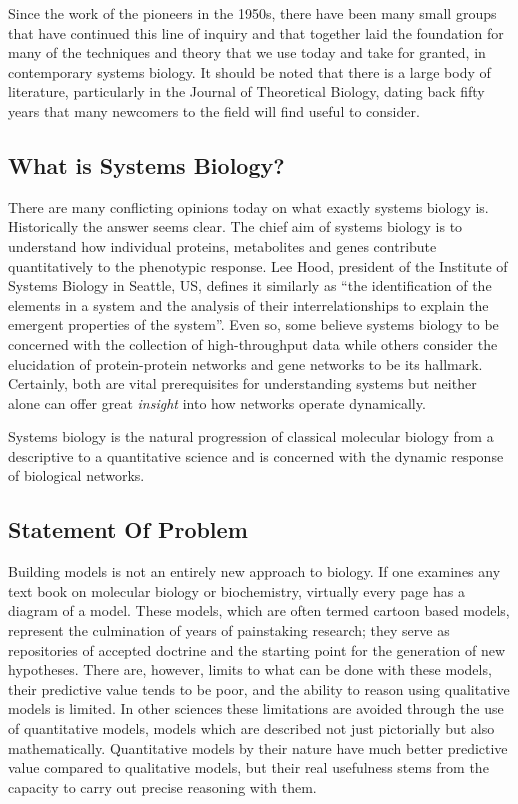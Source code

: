 \documentclass[]{article}
\begin{document}
Since the work of the pioneers in the 1950s, there have been many small
groups that have continued this line of inquiry and that together laid
the foundation for many of the techniques and theory that we use today
and take for granted, in contemporary systems biology. It should be
noted that there is a large body of literature, particularly in the
Journal of Theoretical Biology, dating back fifty years that many
newcomers to the field will find useful to consider.

\subsection{What is Systems Biology?}

There are many conflicting opinions today on what exactly systems
biology is. Historically the answer seems clear. The chief aim of
systems biology is to understand how individual proteins, metabolites
and genes contribute quantitatively to the phenotypic response. Lee
Hood, president of the Institute of Systems Biology in Seattle, US,
defines it similarly as ``the identification of the elements in a system
and the analysis of their interrelationships to explain the emergent
properties of the system''. Even so, some believe systems biology to be
concerned with the collection of high-throughput data while others
consider the elucidation of protein-protein networks and gene networks
to be its hallmark. Certainly, both are vital prerequisites for
understanding systems but neither alone can offer great \emph{insight}
into how networks operate dynamically.

Systems biology is the natural progression of classical molecular
biology from a descriptive to a quantitative science and is concerned
with the dynamic response of biological networks.

\subsection{Statement Of Problem}

Building models is not an entirely new approach to biology. If one
examines any text book on molecular biology or biochemistry, virtually
every page has a diagram of a model. These models, which are often
termed cartoon based models, represent the culmination of years of
painstaking research; they serve as repositories of accepted doctrine
and the starting point for the generation of new hypotheses. There are,
however, limits to what can be done with these models, their predictive
value tends to be poor, and the ability to reason using qualitative
models is limited. In other sciences these limitations are avoided
through the use of quantitative models, models which are described not
just pictorially but also mathematically. Quantitative models by their
nature have much better predictive value compared to qualitative models,
but their real usefulness stems from the capacity to carry out precise
reasoning with them.
\end{document}
